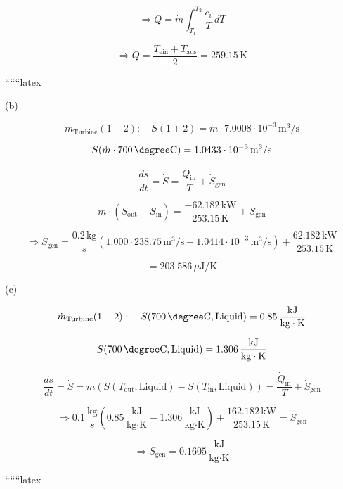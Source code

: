 \[
\Rightarrow \dot{Q} = \dot{m} \int_{T_1}^{T_2} \frac{c_i}{T} \, dT
\]

\[
\Rightarrow \dot{Q} = \frac{T_{\text{ein}} + T_{\text{aus}}}{2} = 259.15 \, \text{K}
\]

``````latex

(b)

\[
\dot{m}_{\text{Turbine}} (1-2): \quad S(1+2) = \dot{m} \cdot 7.0008 \cdot 10^{-3} \, \text{m}^3/\text{s}
\]

\[
S(\dot{m} \cdot 700 \, \degree \text{C}) = 1.0433 \cdot 10^{-3} \, \text{m}^3/\text{s}
\]

\[
\frac{ds}{dt} = \dot{S} = \frac{\dot{Q}_{\text{in}}}{T} + \dot{S}_{\text{gen}}
\]

\[
\dot{m} \cdot (\dot{S}_{\text{out}} - \dot{S}_{\text{in}}) = \frac{-62.182 \, \text{kW}}{253.15 \, \text{K}} + \dot{S}_{\text{gen}}
\]

\[
\Rightarrow \dot{S}_{\text{gen}} = \frac{0.2 \, \text{kg}}{s} \left( 1.000 \cdot 238.75 \, \text{m}^3/\text{s} - 1.0414 \cdot 10^{-3} \, \text{m}^3/\text{s} \right) + \frac{62.182 \, \text{kW}}{253.15 \, \text{K}}
\]

\[
= 203.586 \, \mu \text{J}/\text{K}
\]

(c) 

\[
\dot{m}_{\text{Turbine}} (1-2): \quad S(700 \, \degree \text{C}, \text{Liquid}) = 0.85 \, \frac{\text{kJ}}{\text{kg} \cdot \text{K}}
\]

\[
S(700 \, \degree \text{C}, \text{Liquid}) = 1.306 \, \frac{\text{kJ}}{\text{kg} \cdot \text{K}}
\]

\[
\frac{ds}{dt} = \dot{S} = \dot{m} \left( S(T_{\text{out}}, \text{Liquid}) - S(T_{\text{in}}, \text{Liquid}) \right) = \frac{\dot{Q}_{\text{in}}}{T} + \dot{S}_{\text{gen}}
\]

\[
\Rightarrow 0.1 \, \frac{\text{kg}}{s} \left( 0.85 \, \frac{\text{kJ}}{\text{kg} \cdot \text{K}} - 1.306 \, \frac{\text{kJ}}{\text{kg} \cdot \text{K}} \right) + \frac{162.182 \, \text{kW}}{253.15 \, \text{K}} = \dot{S}_{\text{gen}}
\]

\[
\Rightarrow \dot{S}_{\text{gen}} = 0.1605 \, \frac{\text{kJ}}{\text{kg} \cdot \text{K}}
\]

``````latex


